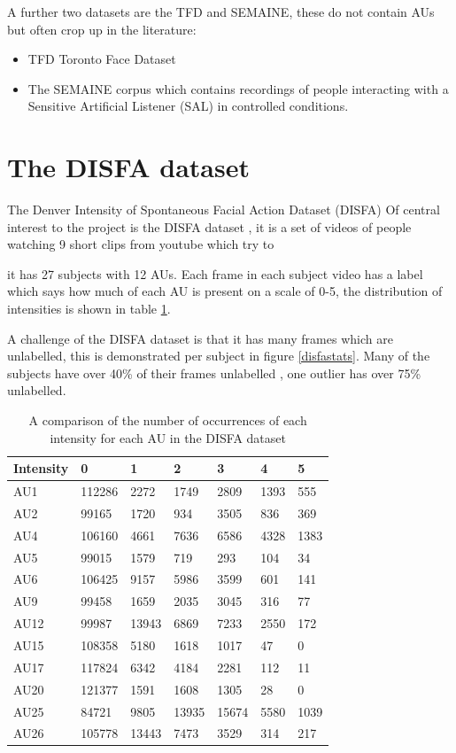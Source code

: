 \documentclass[11pt,twoside]{report}
\begin{document}
A further two datasets are the TFD and SEMAINE, these do not contain AUs but often crop up in the
literature:
\begin{itemize}
     \item TFD \cite{tfd} Toronto Face Dataset
     \item The SEMAINE \cite{semaine} corpus which contains recordings
           of people interacting with a Sensitive Artificial Listener (SAL) in controlled conditions.
\end{itemize}

\section{The DISFA dataset} \label{disfa_list}
The Denver Intensity of Spontaneous Facial Action Dataset (DISFA)
Of central interest to the project is the DISFA dataset \cite{disfa}, it is a set
of videos of people watching 9 short clips from youtube which try to


 it has 27 subjects with 12 AUs.
Each frame in each subject video has a label which says how much of each AU is present on
a scale of 0-5, the distribution of intensities is shown in table \ref{compau}.

A challenge of the DISFA dataset is that it has many frames which are unlabelled, this is demonstrated
per subject in figure \ref{disfastats}. Many of the subjects have over 40\% of their frames unlabelled
, one outlier has over 75\% unlabelled.

\begin{table}[h!]
\centering

\begin{tabular}{lllllll}
\hline
Intensity & 0      & 1     & 2     & 3     & 4    & 5    \\ \hline
AU1       & 112286 & 2272  & 1749  & 2809  & 1393 & 555  \\
AU2       & 99165  & 1720  & 934   & 3505  & 836  & 369  \\
AU4       & 106160 & 4661  & 7636  & 6586  & 4328 & 1383 \\
AU5       & 99015  & 1579  & 719   & 293   & 104  & 34   \\
AU6       & 106425 & 9157  & 5986  & 3599  & 601  & 141  \\
AU9       & 99458  & 1659  & 2035  & 3045  & 316  & 77   \\
AU12      & 99987  & 13943 & 6869  & 7233  & 2550 & 172  \\
AU15      & 108358 & 5180  & 1618  & 1017  & 47   & 0    \\
AU17      & 117824 & 6342  & 4184  & 2281  & 112  & 11   \\
AU20      & 121377 & 1591  & 1608  & 1305  & 28   & 0    \\
AU25      & 84721  & 9805  & 13935 & 15674 & 5580 & 1039 \\
AU26      & 105778 & 13443 & 7473  & 3529  & 314  & 217  \\ \hline
\end{tabular}
\caption{A comparison of the number of occurrences of each intensity for each AU in the DISFA dataset} \label{compau}
\end{table}
\end{document}
